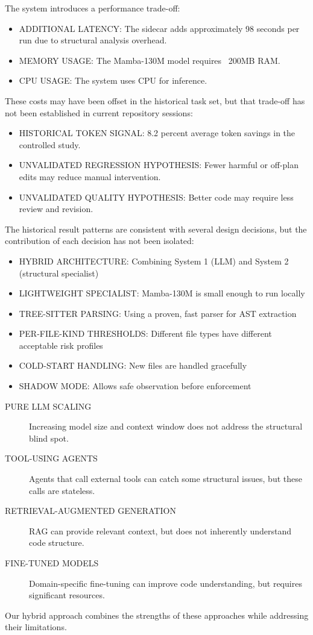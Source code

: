 
The system introduces a performance trade-off:

\begin{itemize}
    \item ADDITIONAL LATENCY: The sidecar adds approximately 98 seconds per run due to structural analysis overhead.
    \item MEMORY USAGE: The Mamba-130M model requires ~200MB RAM.
    \item CPU USAGE: The system uses CPU for inference.
\end{itemize}

These costs may have been offset in the historical task set, but that trade-off
has not been established in current repository sessions:
\begin{itemize}
    \item HISTORICAL TOKEN SIGNAL: 8.2 percent average token savings in the controlled study.
    \item UNVALIDATED REGRESSION HYPOTHESIS: Fewer harmful or off-plan edits may reduce manual intervention.
    \item UNVALIDATED QUALITY HYPOTHESIS: Better code may require less review and revision.
\end{itemize}


The historical result patterns are consistent with several design decisions,
but the contribution of each decision has not been isolated:

\begin{itemize}
    \item HYBRID ARCHITECTURE: Combining System 1 (LLM) and System 2 (structural specialist)
    \item LIGHTWEIGHT SPECIALIST: Mamba-130M is small enough to run locally
    \item TREE-SITTER PARSING: Using a proven, fast parser for AST extraction
    \item PER-FILE-KIND THRESHOLDS: Different file types have different acceptable risk profiles
    \item COLD-START HANDLING: New files are handled gracefully
    \item SHADOW MODE: Allows safe observation before enforcement
\end{itemize}


\begin{description}
    \item[PURE LLM SCALING] Increasing model size and context window does not address the structural blind spot.
    \item[TOOL-USING AGENTS] Agents that call external tools can catch some structural issues, but these calls are stateless.
    \item[RETRIEVAL-AUGMENTED GENERATION] RAG can provide relevant context, but does not inherently understand code structure.
    \item[FINE-TUNED MODELS] Domain-specific fine-tuning can improve code understanding, but requires significant resources.
\end{description}

Our hybrid approach combines the strengths of these approaches while addressing their limitations.

